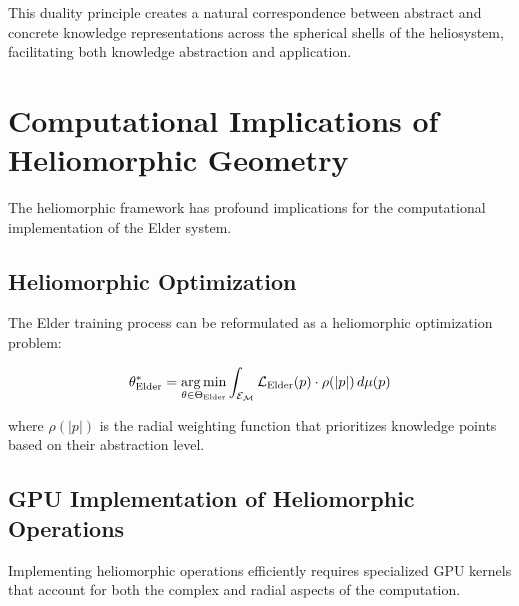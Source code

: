 This duality principle creates a natural correspondence between abstract and concrete knowledge representations across the spherical shells of the heliosystem, facilitating both knowledge abstraction and application.

\section{Computational Implications of Heliomorphic Geometry}

The heliomorphic framework has profound implications for the computational implementation of the Elder system.

\subsection{Heliomorphic Optimization}

The Elder training process can be reformulated as a heliomorphic optimization problem:

\begin{equation}
\theta_{\text{Elder}}^* = \mathop{\mathrm{arg\,min}}_{\theta \in \Theta_{\text{Elder}}} \int_{\mathcal{E}_{\mathcal{M}}} \mathcal{L}_{\text{Elder}}(p) \cdot \rho(|p|) \, d\mu(p)
\end{equation}

where $\rho(|p|)$ is the radial weighting function that prioritizes knowledge points based on their abstraction level.

\subsection{GPU Implementation of Heliomorphic Operations}

Implementing heliomorphic operations efficiently requires specialized GPU kernels that account for both the complex and radial aspects of the computation.

